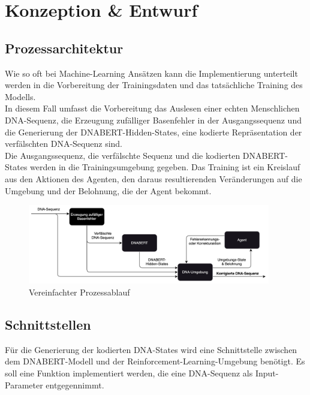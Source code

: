 \documentclass[oneside,bibliography=totocnumbered,BCOR=5mm]{scrbook}%
\theoremstyle{definition}
\theoremstyle{definition}
\theoremstyle{definition}
\theoremstyle{definition}
\theoremstyle{definition}
\theoremstyle{definition}
\begin{document}
\chapter{Konzeption \& Entwurf}
\section{Prozessarchitektur}

Wie so oft bei Machine-Learning Ansätzen kann die Implementierung unterteilt werden in
die Vorbereitung der Trainingsdaten und das tatsächliche Training des Modells. \\

In diesem Fall umfasst die Vorbereitung das Auslesen einer echten Menschlichen DNA-Sequenz,
die Erzeugung zufälliger Basenfehler in der Ausgangssequenz und die Generierung der DNABERT-Hidden-States, 
eine kodierte Repräsentation der verfälschten DNA-Sequenz sind. \\

Die Ausgangssequenz, die verfälschte Sequenz und die kodierten DNABERT-States werden in die Trainingsumgebung
gegeben. Das Training ist ein Kreislauf aus den Aktionen des Agenten, den daraus resultierenden 
Veränderungen auf die Umgebung und der Belohnung, die der Agent bekommt.\\
\linebreak[4]
\linebreak[4]

\begin{figure}[h]
  \centering
  \includegraphics[width=400px,keepaspectratio]{images/Process_simplified.png}
  \caption{Vereinfachter Prozessablauf}
  \label{process_simplified}
  \end{figure}

\newpage

\section{Schnittstellen}
Für die Generierung der kodierten DNA-States wird eine Schnittstelle zwischen dem 
DNABERT-Modell und der Reinforcement-Learning-Umgebung benötigt. 
Es soll eine Funktion implementiert werden, die eine DNA-Sequenz als Input-Parameter entgegennimmt. \\
\end{document}

